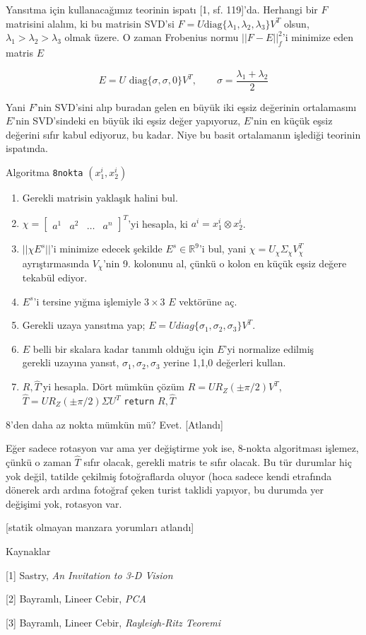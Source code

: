 \documentclass[12pt,fleqn]{article}\usepackage{../../common}
\begin{document}
Yansıtma için kullanacağımız teorinin ispatı [1, sf. 119]'da. Herhangi bir $F$
matrisini alalım, ki bu matrisin SVD'si $F = U \textrm{diag}
\{\lambda_1,\lambda_2,\lambda_3\} V^T$ olsun, $\lambda_1 > \lambda_2 >
\lambda_3$ olmak üzere. O zaman Frobenius normu $|| F - E||_f^2$'i minimize eden
matris $E$

$$ E = U \textrm{ diag}\{\sigma,\sigma,0\} V^T , \qquad \sigma = \frac{\lambda_1+\lambda_2}{2}$$

Yani $F$'nin SVD'sini alıp buradan gelen en büyük iki eşsiz değerinin
ortalamasını $E$'nin SVD'sindeki en büyük iki eşsiz değer yapıyoruz, $E$'nin en
küçük eşsiz değerini sıfır kabul ediyoruz, bu kadar. Niye bu basit ortalamanın
işlediği teorinin ispatında.

Algoritma \verb!8nokta! $\left(x_1^i,x_2^i\right)$
\begin{enumerate}
  \item Gerekli matrisin yaklaşık halini bul.
  \item $\chi = \left[\begin{array}{cccc} a^1 & a^2 & \dots & a^n \end{array}\right]^T$'yi hesapla,  ki $a^i = x_1^i \otimes x_2^i$.
  \item $||\chi E^s||$'i minimize edecek şekilde $E^s \in \mathbb{R}^9$'i bul, yani
    $\chi = U_\chi \Sigma_\chi V_\chi^T$ ayrıştırmasında $V_\chi$'nin 9. kolonunu al,
    çünkü o kolon en küçük eşsiz değere tekabül ediyor. 
  \item $E^s$'i tersine yığma işlemiyle $3 \times 3$ $E$ vektörüne aç. 
  \item Gerekli uzaya yansıtma yap; $E = U diag\{\sigma_1,\sigma_2,\sigma_3\} V^T $.
  \item  $E$ belli bir skalara kadar tanımlı olduğu için $E$'yi normalize edilmiş \\
    gerekli uzayına yansıt, $\sigma_1,\sigma_2,\sigma_3$ yerine 1,1,0 değerleri kullan.
  \item $R,\hat{T}$'yi hesapla. Dört mümkün çözüm $R=UR_Z(\pm \pi/2)V^T$,$\hat{T}=UR_Z(\pm\pi/2)\Sigma U^T$
  \verb!return! $R,\hat{T}$ 
\end{enumerate}


8'den daha az nokta mümkün mü? Evet. [Atlandı]

Eğer sadece rotasyon var ama yer değiştirme yok ise, 8-nokta algoritması
işlemez, çünkü o zaman $\hat{T}$ sıfır olacak, gerekli matris te sıfır
olacak. Bu tür durumlar hiç yok değil, tatilde çekilmiş fotoğraflarda oluyor
(hoca sadece kendi etrafında dönerek ardı ardına fotoğraf çeken turist taklidi
yapıyor, bu durumda yer değişimi yok, rotasyon var.

[statik olmayan manzara yorumları atlandı]

Kaynaklar 

[1] Sastry, {\em An Invitation to 3-D Vision}

[2] Bayramlı, Lineer Cebir, {\em PCA}

[3] Bayramlı, Lineer Cebir, {\em Rayleigh-Ritz Teoremi}
\end{document}

